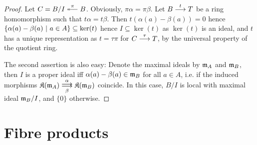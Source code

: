 \documentclass[a4paper,parskip=half,numbers=enddot, DIV=12]{scrreprt}
\begin{document}
	\begin{proof}
        Let $C = B/I \lepimorphism[\pi] B$. Obviously, $\pi \alpha = \pi\beta$. Let $B\morphism[t] T$ be a ring homomorphism such that $t\alpha = t\beta$. Then $t(\alpha(a)-\beta(a)) = 0$ hence $\left\{\alpha(a)-\beta(a)\ \middle|\  a\in A\right\} \subseteq \ker(t)$ hence $I\subseteq \ker(t)$ as $\ker(t)$ is an ideal, and $t$ has a unique representation as $t=\tau\pi$ for $C\morphism[\tau] T$, by the universal property of the quotient ring.
        
        The second assertion is also easy: Denote the maximal ideals by $\mathfrak{m}_A$ and $\mathfrak{m}_B$, then $I$ is a proper ideal iff $\alpha(a)-\beta(a)\in\mathfrak{m}_B$ for all $a\in A$, i.e. if the induced morphisms $\KK(\mm_A)\doublemorphism[\alpha][\smash{\beta}]\KK(\mm_B)$ coincide. In this case, $B/I$ is local with maximal ideal $\mathfrak{m}_B/I$, and $\{0\}$ otherwise.
	\end{proof}
	

\section{Fibre products}
\end{document}
